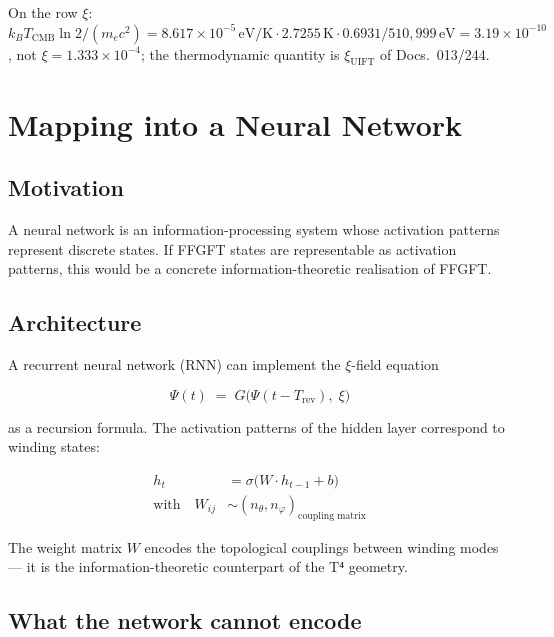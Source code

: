 On the row $\xi$: $k_BT_\text{CMB}\ln2/(m_ec^2) = 8.617\times10^{-5}\,\text{eV/K}\cdot2.7255\,\text{K}\cdot0.6931/510{,}999\,\text{eV} = 3.19\times10^{-10}$, not $\xi = 1.333\times10^{-4}$; the thermodynamic quantity is $\xi_\text{UIFT}$ of Docs.~013/244.

\section{Mapping into a Neural Network}

\subsection{Motivation}

A neural network is an information-processing system whose activation
patterns represent discrete states. If FFGFT states are representable
as activation patterns, this would be a concrete information-theoretic
realisation of FFGFT.

\subsection{Architecture}

A recurrent neural network (RNN) can implement the $\xi$-field equation

\begin{equation}
  \Psi(t) \;=\; G\bigl(\Psi(t - T_\text{rev}),\; \xi\bigr)
  \tag{243.4}
\end{equation}

as a recursion formula. The activation patterns of the hidden layer
correspond to winding states:

\begin{align}
  h_t &= \sigma\bigl(W \cdot h_{t-1} + b\bigr) \tag{243.5} \\
  \text{with}\quad W_{ij} &\sim (n_\theta, n_\varphi)_\text{coupling matrix}
  \tag{243.6}
\end{align}

The weight matrix $W$ encodes the topological couplings between winding
modes --- it is the information-theoretic counterpart of the T⁴ geometry.

\subsection{What the network cannot encode}

